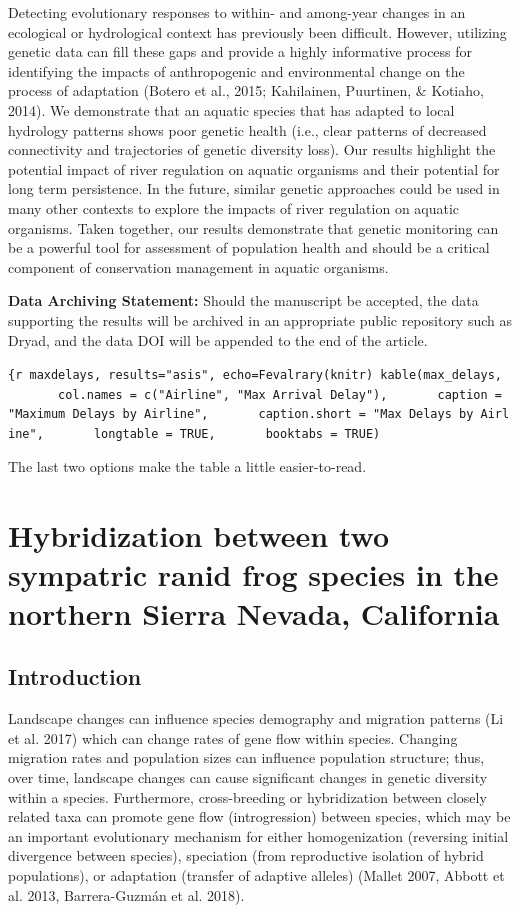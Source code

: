 \documentclass[twoside,12pt,final]{ucthesis-CA2012}
\begin{document}
\begin{ucmainmatter}
Detecting evolutionary responses to within- and among-year changes in an
ecological or hydrological context has previously been difficult.
However, utilizing genetic data can fill these gaps and provide a highly
informative process for identifying the impacts of anthropogenic and
environmental change on the process of adaptation (Botero et al., 2015;
Kahilainen, Puurtinen, \& Kotiaho, 2014). We demonstrate that an aquatic
species that has adapted to local hydrology patterns shows poor genetic
health (i.e., clear patterns of decreased connectivity and trajectories
of genetic diversity loss). Our results highlight the potential impact
of river regulation on aquatic organisms and their potential for long
term persistence. In the future, similar genetic approaches could be
used in many other contexts to explore the impacts of river regulation
on aquatic organisms. Taken together, our results demonstrate that
genetic monitoring can be a powerful tool for assessment of population
health and should be a critical component of conservation management in
aquatic organisms.

\textbf{Data Archiving Statement:} Should the manuscript be accepted,
the data supporting the results will be archived in an appropriate
public repository such as Dryad, and the data DOI will be appended to
the end of the article.

\texttt{\{r\ maxdelays,\ results="asis",\ echo=Fevalrary(knitr)\ kable(max\_delays,\ \ \ \ \ \ \ \ col.names\ =\ c("Airline",\ "Max\ Arrival\ Delay"),\ \ \ \ \ \ \ caption\ =\ "Maximum\ Delays\ by\ Airline",\ \ \ \ \ \ \ caption.short\ =\ "Max\ Delays\ by\ Airline",\ \ \ \ \ \ \ longtable\ =\ TRUE,\ \ \ \ \ \ \ booktabs\ =\ TRUE)}

The last two options make the table a little easier-to-read.

\hypertarget{hybrids}{%
\chapter{Hybridization between two sympatric ranid frog species in the
northern Sierra Nevada, California}\label{hybrids}}

\hypertarget{introduction-1}{%
\section{Introduction}\label{introduction-1}}

Landscape changes can influence species demography and migration
patterns (Li et al. 2017) which can change rates of gene flow within
species. Changing migration rates and population sizes can influence
population structure; thus, over time, landscape changes can cause
significant changes in genetic diversity within a species. Furthermore,
cross-breeding or hybridization between closely related taxa can promote
gene flow (introgression) between species, which may be an important
evolutionary mechanism for either homogenization (reversing initial
divergence between species), speciation (from reproductive isolation of
hybrid populations), or adaptation (transfer of adaptive alleles)
(Mallet 2007, Abbott et al. 2013, Barrera-Guzmán et al. 2018).


\end{ucmainmatter}
\end{document}
